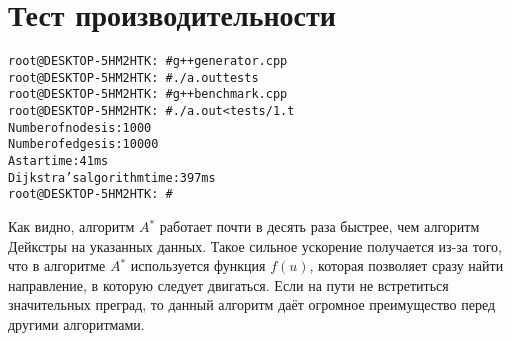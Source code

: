 \section{Тест производительности}

\begin{alltt}
root@DESKTOP-5HM2HTK:~# g++ generator.cpp
root@DESKTOP-5HM2HTK:~# ./a.out tests
root@DESKTOP-5HM2HTK:~# g++ benchmark.cpp
root@DESKTOP-5HM2HTK:~# ./a.out <tests/1.t
Number of nodes is: 1000
Number of edges is: 10000
A star time: 41ms
Dijkstra's algorithm time: 397ms
root@DESKTOP-5HM2HTK:~#
\end{alltt}

Как видно, алгоритм $A$$^*$ работает почти в десять раза быстрее, чем алгоритм Дейкстры на указанных данных. Такое сильное ускорение получается из-за того, что в алгоритме $A$$^*$ используется функция $f(u)$, которая позволяет сразу найти направление, в которую следует двигаться. Если на пути не встретиться значительных преград, то данный алгоритм даёт огромное преимущество перед другими алгоритмами.

\pagebreak

